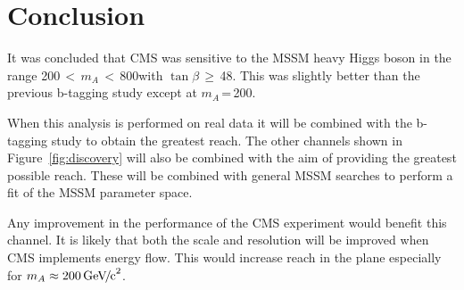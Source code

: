 
\section{Conclusion}
It was concluded that CMS was sensitive to the MSSM heavy Higgs boson in the range 200\,$<$\,$m_{A}$\,$<$\,800\GeVcc with $\tan{\beta}$\,$\ge$\,48. This was slightly better than the previous b-tagging study except at $m_{A}$\,=\,200\GeVcc. 

When this analysis is performed on real data it will be combined with the b-tagging study to obtain the greatest reach. The other channels shown in Figure~\ref{fig:discovery} will also be combined with the aim of providing the greatest possible reach. These will be combined with general MSSM searches to perform a fit of the MSSM parameter space.

Any improvement in the \MET performance of the CMS experiment would benefit this channel. It is likely that both the \MET scale and resolution will be improved when CMS implements energy flow. This would increase reach in the \plane plane especially for $m_{A} \approx 200 {\,\mathrm{Ge\hspace{-.08em}V\hspace{-0.16em}/\hspace{-0.08em}c}^\mathrm{2}}$.